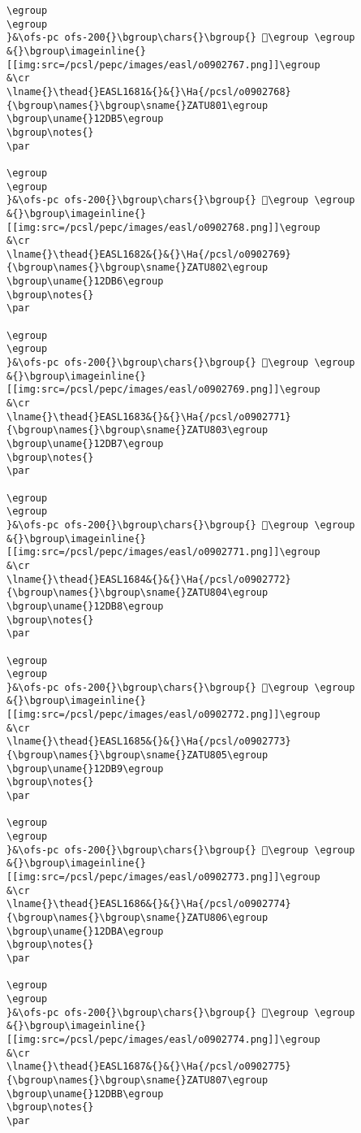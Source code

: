\begin{verbatim}
\egroup
\egroup
}&\ofs-pc ofs-200{}\bgroup\chars{}\bgroup{} 𒶴\egroup \egroup
&{}\bgroup\imageinline{}[[img:src=/pcsl/pepc/images/easl/o0902767.png]]\egroup
&\cr
\lname{}\thead{}EASL1681&{}&{}\Ha{/pcsl/o0902768}{\bgroup\names{}\bgroup\sname{}ZATU801\egroup
\bgroup\uname{}12DB5\egroup
\bgroup\notes{}
\par 

\egroup
\egroup
}&\ofs-pc ofs-200{}\bgroup\chars{}\bgroup{} 𒶵\egroup \egroup
&{}\bgroup\imageinline{}[[img:src=/pcsl/pepc/images/easl/o0902768.png]]\egroup
&\cr
\lname{}\thead{}EASL1682&{}&{}\Ha{/pcsl/o0902769}{\bgroup\names{}\bgroup\sname{}ZATU802\egroup
\bgroup\uname{}12DB6\egroup
\bgroup\notes{}
\par 

\egroup
\egroup
}&\ofs-pc ofs-200{}\bgroup\chars{}\bgroup{} 𒶶\egroup \egroup
&{}\bgroup\imageinline{}[[img:src=/pcsl/pepc/images/easl/o0902769.png]]\egroup
&\cr
\lname{}\thead{}EASL1683&{}&{}\Ha{/pcsl/o0902771}{\bgroup\names{}\bgroup\sname{}ZATU803\egroup
\bgroup\uname{}12DB7\egroup
\bgroup\notes{}
\par 

\egroup
\egroup
}&\ofs-pc ofs-200{}\bgroup\chars{}\bgroup{} 𒶷\egroup \egroup
&{}\bgroup\imageinline{}[[img:src=/pcsl/pepc/images/easl/o0902771.png]]\egroup
&\cr
\lname{}\thead{}EASL1684&{}&{}\Ha{/pcsl/o0902772}{\bgroup\names{}\bgroup\sname{}ZATU804\egroup
\bgroup\uname{}12DB8\egroup
\bgroup\notes{}
\par 

\egroup
\egroup
}&\ofs-pc ofs-200{}\bgroup\chars{}\bgroup{} 𒶸\egroup \egroup
&{}\bgroup\imageinline{}[[img:src=/pcsl/pepc/images/easl/o0902772.png]]\egroup
&\cr
\lname{}\thead{}EASL1685&{}&{}\Ha{/pcsl/o0902773}{\bgroup\names{}\bgroup\sname{}ZATU805\egroup
\bgroup\uname{}12DB9\egroup
\bgroup\notes{}
\par 

\egroup
\egroup
}&\ofs-pc ofs-200{}\bgroup\chars{}\bgroup{} 𒶹\egroup \egroup
&{}\bgroup\imageinline{}[[img:src=/pcsl/pepc/images/easl/o0902773.png]]\egroup
&\cr
\lname{}\thead{}EASL1686&{}&{}\Ha{/pcsl/o0902774}{\bgroup\names{}\bgroup\sname{}ZATU806\egroup
\bgroup\uname{}12DBA\egroup
\bgroup\notes{}
\par 

\egroup
\egroup
}&\ofs-pc ofs-200{}\bgroup\chars{}\bgroup{} 𒶺\egroup \egroup
&{}\bgroup\imageinline{}[[img:src=/pcsl/pepc/images/easl/o0902774.png]]\egroup
&\cr
\lname{}\thead{}EASL1687&{}&{}\Ha{/pcsl/o0902775}{\bgroup\names{}\bgroup\sname{}ZATU807\egroup
\bgroup\uname{}12DBB\egroup
\bgroup\notes{}
\par 


\end{verbatim}
